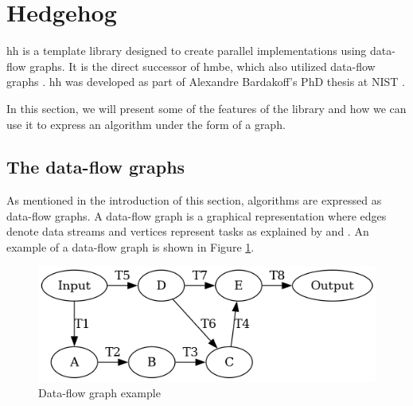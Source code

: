 
\section{Hedgehog}
\label{sec:hh}

\gls{hh} is a template library designed to create parallel implementations using
data-flow graphs. It is the direct successor of \gls{hmbe}, which also utilized
data-flow graphs \cite{blattner2017model}. \gls{hh} was developed as part of
Alexandre Bardakoff's PhD thesis at NIST \cite{bardakoff2021analysis}.

In this section, we will present some of the features of the library and how
we can use it to express an algorithm under the form of a graph.

\subsection{The data-flow graphs}

As mentioned in the introduction of this section, algorithms are expressed as
data-flow graphs. A data-flow graph is a graphical representation where edges
denote data streams and vertices represent tasks as explained by
\cite{kavi1986formal} and \cite{bardakoff2021analysis}. An example of a
data-flow graph is shown in Figure \ref{fig:data-flow-graph-example}.

\begin{figure}[h!]
  \begin{center}
    \includegraphics[scale=0.5]{./img/data-flow-graph-example.png}
    \caption{Data-flow graph example}
    \label{fig:data-flow-graph-example}
  \end{center}
\end{figure}

